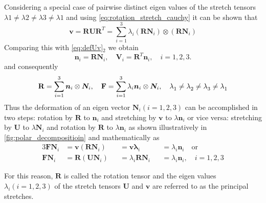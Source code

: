 Considering a special case of pairwise distinct eigen values of the stretch tensors \(\lambda{1}\neq \lambda{2} \neq \lambda{3}\neq \lambda{1}\) and using \cref{eq:rotation_stretch_cauchy} it can be shown that 
\begin{equation}
    \mathbf{v} = \mathbf{R}\mathbf{U}\mathbf{R}^{T} 
    = \sum_{i=1}^{3}  \lambda_{i} (\mathbf{R}\bm{N}_{i}) \otimes (\mathbf{R}\bm{N}_{i})
\end{equation}
Comparing this with \cref{eq:defUv}\({}_2\) we obtain
\begin{equation}
    \bm{n}_{i} = \mathbf{R}\bm{N}_{i}, \quad
    \bm{V}_{i} = \mathbf{R}^{T}\bm{n}_{i}, \quad
    i = 1,2,3.
\end{equation}
and consequently
\begin{equation}
    \mathbf{R} = \sum_{i=1}^{3}  \bm{n}_{i} \otimes \bm{N}_{i}, \quad
    \mathbf{F} = \sum_{i=1}^{3}  \lambda_{i} \bm{n}_{i} \otimes \bm{N}_{i}, \quad
    \lambda^{}_{{1}} \neq \lambda^{}_{{2}} \neq \lambda^{}_{{3}} \neq \lambda^{}_{{1}} 
\end{equation}
Thus the deformation of an eigen vector \(\bm{N}_{i} (i=1,2,3)\) can be accomplished in two steps: rotation by \(\mathbf{R}\) to \(\bm{n}_{i}\) and stretching by \(\mathbf{v}\) to \(\lambda\bm{n}_{i}\) or vice versa: stretching by \(\mathbf{U}\) to \(\lambda\bm{N}_{i}\) and rotation by \(\mathbf{R}\) to \(\lambda\bm{n}_{i}\) as shown illustratively in \cref{fig:polar_decompositioin} and mathematically as
\begin{alignat}{3}
    \nonumber\mathbf{F}\bm{N}_{i} 
    &= \mathbf{v}(\mathbf{R}\bm{N}_{i}) 
    &&=  \mathbf{v}\bm{\lambda}_{i} 
    &&= \lambda_{i}\bm{n}_{i} \quad \text{or} \\
    \mathbf{F}\bm{N}_{i}
    &= \mathbf{R}(\mathbf{U}\bm{N}_{i}) 
    &&= \lambda_{i}\mathbf{R}\bm{N}_{i}
    &&= \lambda_{i}\bm{n}_{i}, \quad
    i = 1,2,3
\end{alignat}

For this reason, \(\mathbf{R}\) is called the rotation tensor and the eigen values \(\lambda_{i}(i=1,2,3)\) of the stretch tensors \(\mathbf{U}\) and \(\mathbf{v}\) are referred to as the principal stretches.
